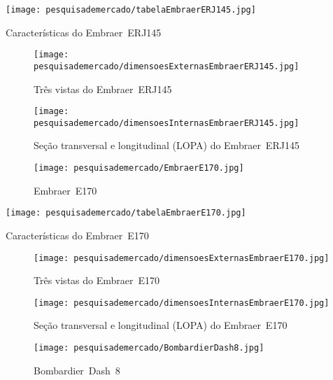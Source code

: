 \begin{table}
\centering
\texttt{[image: pesquisademercado/tabelaEmbraerERJ145.jpg]}
\caption{Características do Embraer~ERJ145}
\end{table}

\begin{sidewaysfigure}[p]
\texttt{[image: pesquisademercado/dimensoesExternasEmbraerERJ145.jpg]}
\caption{Três vistas do Embraer~ERJ145}
\end{sidewaysfigure}

\begin{sidewaysfigure}[p]
\texttt{[image: pesquisademercado/dimensoesInternasEmbraerERJ145.jpg]}
\caption{Seção transversal e longitudinal (LOPA) do Embraer~ERJ145}
\end{sidewaysfigure}

\clearpage
\begin{figure}
\centering
\texttt{[image: pesquisademercado/EmbraerE170.jpg]}
\caption{Embraer~E170}
\end{figure}

\begin{table}
\centering
\texttt{[image: pesquisademercado/tabelaEmbraerE170.jpg]}
\caption{Características do Embraer~E170}
\end{table}

\begin{sidewaysfigure}[p]
\texttt{[image: pesquisademercado/dimensoesExternasEmbraerE170.jpg]}
\caption{Três vistas do Embraer~E170}
\end{sidewaysfigure}

\begin{sidewaysfigure}[p]
\texttt{[image: pesquisademercado/dimensoesInternasEmbraerE170.jpg]}
\caption{Seção transversal e longitudinal (LOPA) do Embraer~E170}
\end{sidewaysfigure}

\clearpage
\begin{figure}
\centering
\texttt{[image: pesquisademercado/BombardierDash8.jpg]}
\caption{Bombardier~Dash~8}
\end{figure}

